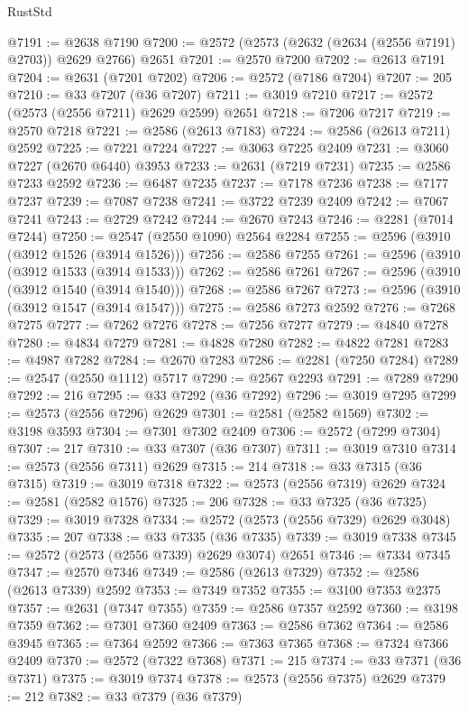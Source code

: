 \begin{lexlean}{RustStd}
\begin{coremodule}
@7191 := @2638 @7190
@7200 := @2572 (@2573 (@2632 (@2634 (@2556 @7191) @2703)) @2629 @2766) @2651
@7201 := @2570 @7200
@7202 := @2613 @7191
@7204 := @2631 (@7201 @7202)
@7206 := @2572 (@7186 @7204)
@7207 := 205
@7210 := @33 @7207 (@36 @7207)
@7211 := @3019 @7210
@7217 := @2572 (@2573 (@2556 @7211) @2629 @2599) @2651
@7218 := @7206 @7217
@7219 := @2570 @7218
@7221 := @2586 (@2613 @7183)
@7224 := @2586 (@2613 @7211) @2592
@7225 := @7221 @7224
@7227 := @3063 @7225 @2409
@7231 := @3060 @7227 (@2670 @6440) @3953
@7233 := @2631 (@7219 @7231)
@7235 := @2586 @7233 @2592
@7236 := @6487 @7235
@7237 := @7178 @7236
@7238 := @7177 @7237
@7239 := @7087 @7238
@7241 := @3722 @7239 @2409
@7242 := @7067 @7241
@7243 := @2729 @7242
@7244 := @2670 @7243
@7246 := @2281 (@7014 @7244)
@7250 := @2547 (@2550 @1090) @2564 @2284
@7255 := @2596 (@3910 (@3912 @1526 (@3914 @1526)))
@7256 := @2586 @7255
@7261 := @2596 (@3910 (@3912 @1533 (@3914 @1533)))
@7262 := @2586 @7261
@7267 := @2596 (@3910 (@3912 @1540 (@3914 @1540)))
@7268 := @2586 @7267
@7273 := @2596 (@3910 (@3912 @1547 (@3914 @1547)))
@7275 := @2586 @7273 @2592
@7276 := @7268 @7275
@7277 := @7262 @7276
@7278 := @7256 @7277
@7279 := @4840 @7278
@7280 := @4834 @7279
@7281 := @4828 @7280
@7282 := @4822 @7281
@7283 := @4987 @7282
@7284 := @2670 @7283
@7286 := @2281 (@7250 @7284)
@7289 := @2547 (@2550 @1112) @5717
@7290 := @2567 @2293
@7291 := @7289 @7290
@7292 := 216
@7295 := @33 @7292 (@36 @7292)
@7296 := @3019 @7295
@7299 := @2573 (@2556 @7296) @2629
@7301 := @2581 (@2582 @1569)
@7302 := @3198 @3593
@7304 := @7301 @7302 @2409
@7306 := @2572 (@7299 @7304)
@7307 := 217
@7310 := @33 @7307 (@36 @7307)
@7311 := @3019 @7310
@7314 := @2573 (@2556 @7311) @2629
@7315 := 214
@7318 := @33 @7315 (@36 @7315)
@7319 := @3019 @7318
@7322 := @2573 (@2556 @7319) @2629
@7324 := @2581 (@2582 @1576)
@7325 := 206
@7328 := @33 @7325 (@36 @7325)
@7329 := @3019 @7328
@7334 := @2572 (@2573 (@2556 @7329) @2629 @3048)
@7335 := 207
@7338 := @33 @7335 (@36 @7335)
@7339 := @3019 @7338
@7345 := @2572 (@2573 (@2556 @7339) @2629 @3074) @2651
@7346 := @7334 @7345
@7347 := @2570 @7346
@7349 := @2586 (@2613 @7329)
@7352 := @2586 (@2613 @7339) @2592
@7353 := @7349 @7352
@7355 := @3100 @7353 @2375
@7357 := @2631 (@7347 @7355)
@7359 := @2586 @7357 @2592
@7360 := @3198 @7359
@7362 := @7301 @7360 @2409
@7363 := @2586 @7362
@7364 := @2586 @3945
@7365 := @7364 @2592
@7366 := @7363 @7365
@7368 := @7324 @7366 @2409
@7370 := @2572 (@7322 @7368)
@7371 := 215
@7374 := @33 @7371 (@36 @7371)
@7375 := @3019 @7374
@7378 := @2573 (@2556 @7375) @2629
@7379 := 212
@7382 := @33 @7379 (@36 @7379)

\end{coremodule}
\end{lexlean}
